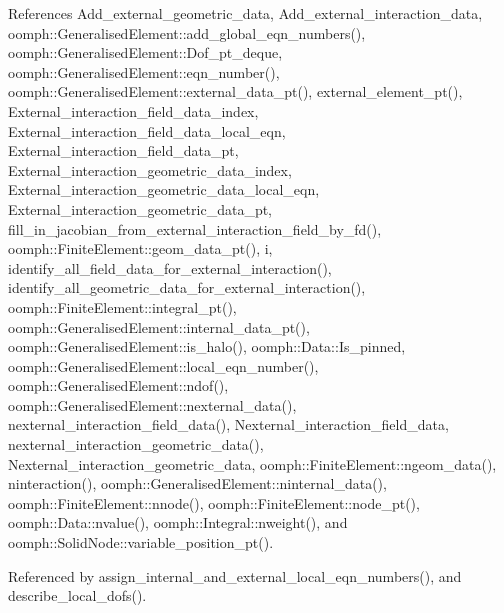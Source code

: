 References Add\+\_\+external\+\_\+geometric\+\_\+data, Add\+\_\+external\+\_\+interaction\+\_\+data, oomph\+::\+Generalised\+Element\+::add\+\_\+global\+\_\+eqn\+\_\+numbers(), oomph\+::\+Generalised\+Element\+::\+Dof\+\_\+pt\+\_\+deque, oomph\+::\+Generalised\+Element\+::eqn\+\_\+number(), oomph\+::\+Generalised\+Element\+::external\+\_\+data\+\_\+pt(), external\+\_\+element\+\_\+pt(), External\+\_\+interaction\+\_\+field\+\_\+data\+\_\+index, External\+\_\+interaction\+\_\+field\+\_\+data\+\_\+local\+\_\+eqn, External\+\_\+interaction\+\_\+field\+\_\+data\+\_\+pt, External\+\_\+interaction\+\_\+geometric\+\_\+data\+\_\+index, External\+\_\+interaction\+\_\+geometric\+\_\+data\+\_\+local\+\_\+eqn, External\+\_\+interaction\+\_\+geometric\+\_\+data\+\_\+pt, fill\+\_\+in\+\_\+jacobian\+\_\+from\+\_\+external\+\_\+interaction\+\_\+field\+\_\+by\+\_\+fd(), oomph\+::\+Finite\+Element\+::geom\+\_\+data\+\_\+pt(), i, identify\+\_\+all\+\_\+field\+\_\+data\+\_\+for\+\_\+external\+\_\+interaction(), identify\+\_\+all\+\_\+geometric\+\_\+data\+\_\+for\+\_\+external\+\_\+interaction(), oomph\+::\+Finite\+Element\+::integral\+\_\+pt(), oomph\+::\+Generalised\+Element\+::internal\+\_\+data\+\_\+pt(), oomph\+::\+Generalised\+Element\+::is\+\_\+halo(), oomph\+::\+Data\+::\+Is\+\_\+pinned, oomph\+::\+Generalised\+Element\+::local\+\_\+eqn\+\_\+number(), oomph\+::\+Generalised\+Element\+::ndof(), oomph\+::\+Generalised\+Element\+::nexternal\+\_\+data(), nexternal\+\_\+interaction\+\_\+field\+\_\+data(), Nexternal\+\_\+interaction\+\_\+field\+\_\+data, nexternal\+\_\+interaction\+\_\+geometric\+\_\+data(), Nexternal\+\_\+interaction\+\_\+geometric\+\_\+data, oomph\+::\+Finite\+Element\+::ngeom\+\_\+data(), ninteraction(), oomph\+::\+Generalised\+Element\+::ninternal\+\_\+data(), oomph\+::\+Finite\+Element\+::nnode(), oomph\+::\+Finite\+Element\+::node\+\_\+pt(), oomph\+::\+Data\+::nvalue(), oomph\+::\+Integral\+::nweight(), and oomph\+::\+Solid\+Node\+::variable\+\_\+position\+\_\+pt().



Referenced by assign\+\_\+internal\+\_\+and\+\_\+external\+\_\+local\+\_\+eqn\+\_\+numbers(), and describe\+\_\+local\+\_\+dofs().

\mbox{\label{classoomph_1_1ElementWithExternalElement_ab8f4dda35ec3b01fe97701d7047b3a9d}} 
